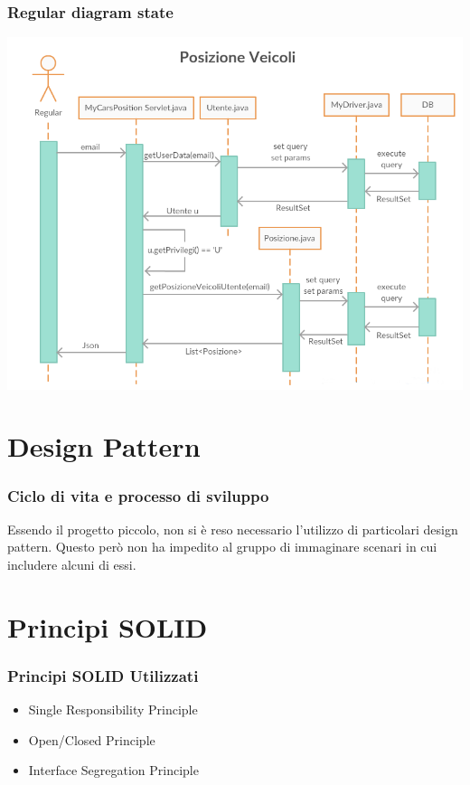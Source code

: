 \documentclass[a4paper,12pt]{beamer}
\begin{document}
\begin{frame}
\frametitle{Regular diagram state}
\includegraphics[scale=0.38]{RegularSeq.png}
\end{frame}

\pagebreak

\section{Design Pattern}
\begin{frame}
\frametitle{Ciclo di vita e processo di sviluppo}
Essendo il progetto piccolo, non si è reso necessario l'utilizzo di particolari design pattern. Questo però non ha impedito al gruppo di immaginare scenari in cui includere alcuni di essi. 
\end{frame}

\pagebreak

\section{Principi SOLID}
\begin{frame}
\frametitle{Principi SOLID Utilizzati}
\begin{itemize}
\item Single Responsibility Principle
\item Open/Closed Principle
\item Interface Segregation Principle
\end{itemize}
\end{frame}

\pagebreak
\end{document}

